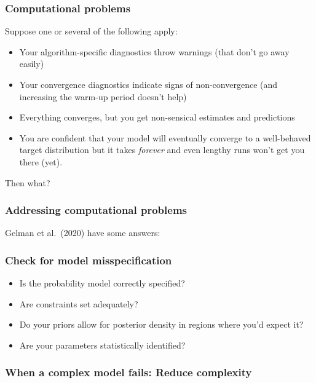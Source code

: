 \documentclass[
  11pt,
]{article}
\providecommand{\tightlist}{%
  \setlength{\itemsep}{0pt}\setlength{\parskip}{0pt}}
\begin{document}
\hypertarget{computational-problems}{%
\subsubsection{Computational problems}\label{computational-problems}}

Suppose one or several of the following apply:

\begin{itemize}
\tightlist
\item
  Your algorithm-specific diagnostics throw warnings (that don't go away easily)
\item
  Your convergence diagnostics indicate signs of non-convergence (and increasing the warm-up period doesn't help)
\item
  Everything converges, but you get non-sensical estimates and predictions
\item
  You are confident that your model will eventually converge to a well-behaved target distribution but it takes \emph{forever} and even lengthy runs won't get you there (yet).
\end{itemize}

Then what?

\hypertarget{addressing-computational-problems}{%
\subsubsection{Addressing computational problems}\label{addressing-computational-problems}}

Gelman et al.~(2020) have some answers:

\hypertarget{check-for-model-misspecification}{%
\subsubsection{Check for model misspecification}\label{check-for-model-misspecification}}

\begin{itemize}
\tightlist
\item
  Is the probability model correctly specified?
\item
  Are constraints set adequately?
\item
  Do your priors allow for posterior density in regions where you'd expect it?
\item
  Are your parameters statistically identified?
\end{itemize}

\hypertarget{when-a-complex-model-fails-reduce-complexity}{%
\subsubsection{When a complex model fails: Reduce complexity}\label{when-a-complex-model-fails-reduce-complexity}}
\end{document}
